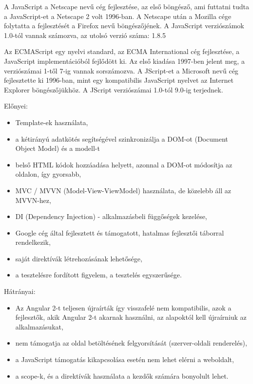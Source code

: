 A JavaScript a Netscape nevű cég fejlesztése, az első böngésző, ami futtatni tudta a JavaScript-et a Netscape 2 volt 1996-ban. A Netscape után a Mozilla cége folytatta a fejlesztését a Firefox nevű böngészőjének. A JavaScript verziószámok 1.0-tól vannak számozva, az utolsó verzió száma: 1.8.5

Az ECMAScript egy nyelvi standard, az ECMA International cég fejlesztése, a JavaScript implementációból fejlődött ki. Az első kiadása 1997-ben jelent meg, a verziószámai 1-től 7-ig vannak sorszámozva.
A JScript-et a Microsoft nevű cég fejlesztette ki 1996-ban, mint egy kompatibilis JavaScript nyelvet az Internet Explorer böngészőjükhöz. A JScript verziószámai 1.0-tól 9.0-ig terjednek.



Előnyei:

\begin{itemize}
\item Template-ek használata, 
\item a kétirányú adatkötés segítségével szinkronizálja a DOM-ot (Document Object Model) és a modell-t
\item belső HTML kódok hozzáadása helyett, azonnal a DOM-ot módosítja az oldalon, így gyorsabb, 
\item MVC / MVVN (Model-View-ViewModel) használata, de közelebb áll az MVVN-hez,
\item DI (Dependency Injection) - alkalmazásbeli függőségek kezelése,
\item Google cég által fejlesztett és támogatott, hatalmas fejlesztői táborral rendelkezik,
\item saját direktívák létrehozásának lehetősége,
\item a tesztelésre fordított figyelem, a tesztelés egyszerűsége.
\end{itemize}

Hátrányai: 

\begin{itemize}
\item Az Angular 2-t teljesen újraírták így visszafelé nem kompatibilis, azok a fejlesztők, akik Angular 2-t akarnak használni, az alapoktól kell újraírniuk az alkalmazásukat,
\item nem támogatja az oldal betöltésének felgyorsítását (szerver-oldali renderelés),
\item a JavaScript támogatás kikapcsolása esetén nem lehet elérni a weboldalt,
\item a scope-k, és a direktívák használata a kezdők számára bonyolult lehet.
\end{itemize}

